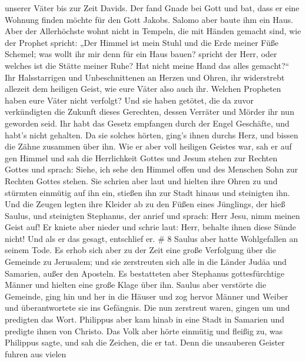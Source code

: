 unserer Väter bis zur Zeit Davids.  Der fand Gnade bei Gott
und bat, dass er eine Wohnung finden möchte für den Gott Jakobs.
 Salomo aber baute ihm ein Haus.  Aber der
Allerhöchste wohnt nicht in Tempeln, die mit Händen gemacht sind, wie
der Prophet spricht:  „Der Himmel ist mein Stuhl und die
Erde meiner Füße Schemel; was wollt ihr mir denn für ein Haus bauen?
spricht der Herr, oder welches ist die Stätte meiner Ruhe? 
Hat nicht meine Hand das alles gemacht?{}``  Ihr
Halsstarrigen und Unbeschnittenen an Herzen und Ohren, ihr widerstrebt
allezeit dem heiligen Geist, wie eure Väter also auch ihr. 
Welchen Propheten haben eure Väter nicht verfolgt? Und sie haben
getötet, die da zuvor verkündigten die Zukunft dieses Gerechten, dessen
Verräter und Mörder ihr nun geworden seid.  Ihr habt das
Gesetz empfangen durch der Engel Geschäfte, und habt's nicht gehalten.
 Da sie solches hörten, ging's ihnen durchs Herz, und
bissen die Zähne zusammen über ihn.  Wie er aber voll
heiligen Geistes war, sah er auf gen Himmel und sah die Herrlichkeit
Gottes und Jesum stehen zur Rechten Gottes  und sprach:
Siehe, ich sehe den Himmel offen und des Menschen Sohn zur Rechten
Gottes stehen.  Sie schrien aber laut und hielten ihre
Ohren zu und stürmten einmütig auf ihn ein, stießen ihn zur Stadt hinaus
und steinigten ihn.  Und die Zeugen legten ihre Kleider ab
zu den Füßen eines Jünglings, der hieß Saulus,  und
steinigten Stephanus, der anrief und sprach: Herr Jesu, nimm meinen
Geist auf!  Er kniete aber nieder und schrie laut: Herr,
behalte ihnen diese Sünde nicht! Und als er das gesagt, entschlief er.
\# 8  Saulus aber hatte Wohlgefallen an seinem Tode. Es
erhob sich aber zu der Zeit eine große Verfolgung über die Gemeinde zu
Jerusalem; und sie zerstreuten sich alle in die Länder Judäa und
Samarien, außer den Aposteln.  Es bestatteten aber Stephanus
gottesfürchtige Männer und hielten eine große Klage über ihn.
 Saulus aber verstörte die Gemeinde, ging hin und her in die
Häuser und zog hervor Männer und Weiber und überantwortete sie ins
Gefängnis.  Die nun zerstreut waren, gingen um und predigten
das Wort.  Philippus aber kam hinab in eine Stadt in
Samarien und predigte ihnen von Christo.  Das Volk aber
hörte einmütig und fleißig zu, was Philippus sagte, und sah die Zeichen,
die er tat.  Denn die unsauberen Geister fuhren aus vielen
